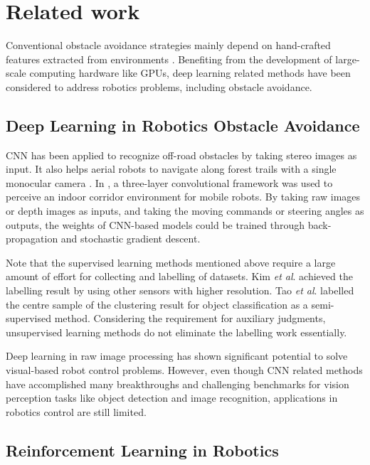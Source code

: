 
\section{Related work}
\label{sec:ob_rel}

Conventional obstacle avoidance strategies mainly depend on hand-crafted features extracted from environments \cite{kuipers1991robot}.
Benefiting from the development of large-scale computing hardware like GPUs, deep learning related methods have been considered to address robotics problems, including obstacle avoidance.

\subsection{Deep Learning in Robotics Obstacle Avoidance}
CNN has been applied to recognize off-road obstacles \cite{muller2005off} by taking stereo images as input. It also helps aerial robots to navigate along forest trails with a single monocular camera \cite{giusti2016machine}. In \cite{tai2016deep}, a three-layer convolutional framework was used to perceive an indoor corridor environment for mobile robots. By taking raw images or depth images as inputs, and taking the moving commands or steering angles as outputs, the weights of CNN-based models could be trained through back-propagation and stochastic gradient descent.

Note that the supervised learning methods mentioned above require a large amount of effort for collecting and labelling of datasets. Kim \textit{et al}. \cite{kim2006traversability} achieved the labelling result by using other sensors with higher resolution. Tao \textit{et al}. \cite{tao2015semi} labelled the centre sample of the clustering result for object classification as a semi-supervised method. Considering the requirement for auxiliary judgments, unsupervised learning methods do not eliminate the labelling work essentially.

Deep learning in raw image processing has shown significant potential to solve visual-based robot control problems.
However, even though CNN related methods have accomplished many breakthroughs and challenging benchmarks for vision perception tasks like object detection and image recognition, applications in robotics control are still limited.

\subsection{Reinforcement Learning in Robotics}

